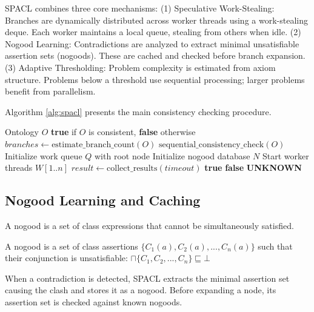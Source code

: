 \documentclass[10pt,a4paper]{article}
\begin{document}
SPACL combines three core mechanisms: (1) Speculative Work-Stealing: Branches are dynamically distributed across worker threads using a work-stealing deque. Each worker maintains a local queue, stealing from others when idle. (2) Nogood Learning: Contradictions are analyzed to extract minimal unsatisfiable assertion sets (nogoods). These are cached and checked before branch expansion. (3) Adaptive Thresholding: Problem complexity is estimated from axiom structure. Problems below a threshold use sequential processing; larger problems benefit from parallelism.

Algorithm \ref{alg:spacl} presents the main consistency checking procedure.

\begin{algorithm}
\caption{SPACL Consistency Check}
\label{alg:spacl}
\begin{algorithmic}[1]
\Require Ontology $O$
\Ensure \textbf{true} if $O$ is consistent, \textbf{false} otherwise
\State $branches \gets \text{estimate\_branch\_count}(O)$
    \State \Return $\text{sequential\_consistency\_check}(O)$
\EndIf
\State Initialize work queue $Q$ with root node
\State Initialize nogood database $N$
\State Start worker threads $W[1..n]$
    \State $result \gets \text{collect\_results}(timeout)$
     \Return \textbf{true}
    \EndIf
     \Return \textbf{false}
    \EndIf
     \Return \textbf{UNKNOWN}
    \EndIf
\EndWhile
\end{algorithmic}
\end{algorithm}

\subsection{Nogood Learning and Caching}

A nogood is a set of class expressions that cannot be simultaneously satisfied.

\begin{definition}[Nogood]
A nogood is a set of class assertions $\{C_1(a), C_2(a), ..., C_n(a)\}$ such that their conjunction is unsatisfiable: $\sqcap\{C_1, C_2, ..., C_n\} \sqsubseteq \bot$
\end{definition}

When a contradiction is detected, SPACL extracts the minimal assertion set causing the clash and stores it as a nogood. Before expanding a node, its assertion set is checked against known nogoods.
\end{document}
